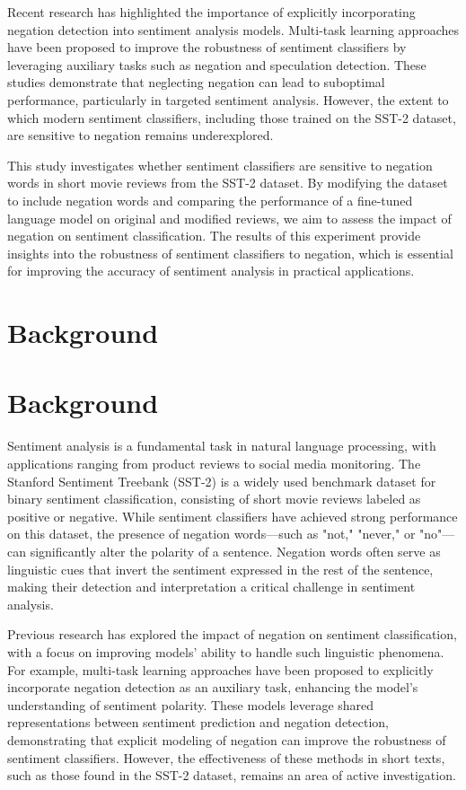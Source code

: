 \documentclass{article}
\begin{document}
Recent research has highlighted the importance of explicitly incorporating negation detection into sentiment analysis models. Multi-task learning approaches have been proposed to improve the robustness of sentiment classifiers by leveraging auxiliary tasks such as negation and speculation detection. These studies demonstrate that neglecting negation can lead to suboptimal performance, particularly in targeted sentiment analysis. However, the extent to which modern sentiment classifiers, including those trained on the SST-2 dataset, are sensitive to negation remains underexplored. 

This study investigates whether sentiment classifiers are sensitive to negation words in short movie reviews from the SST-2 dataset. By modifying the dataset to include negation words and comparing the performance of a fine-tuned language model on original and modified reviews, we aim to assess the impact of negation on sentiment classification. The results of this experiment provide insights into the robustness of sentiment classifiers to negation, which is essential for improving the accuracy of sentiment analysis in practical applications.
\section{Background}
\section{Background}

Sentiment analysis is a fundamental task in natural language processing, with applications ranging from product reviews to social media monitoring. The Stanford Sentiment Treebank (SST-2) is a widely used benchmark dataset for binary sentiment classification, consisting of short movie reviews labeled as positive or negative. While sentiment classifiers have achieved strong performance on this dataset, the presence of negation words—such as "not," "never," or "no"—can significantly alter the polarity of a sentence. Negation words often serve as linguistic cues that invert the sentiment expressed in the rest of the sentence, making their detection and interpretation a critical challenge in sentiment analysis.

Previous research has explored the impact of negation on sentiment classification, with a focus on improving models' ability to handle such linguistic phenomena. For example, multi-task learning approaches have been proposed to explicitly incorporate negation detection as an auxiliary task, enhancing the model's understanding of sentiment polarity. These models leverage shared representations between sentiment prediction and negation detection, demonstrating that explicit modeling of negation can improve the robustness of sentiment classifiers. However, the effectiveness of these methods in short texts, such as those found in the SST-2 dataset, remains an area of active investigation. 
\end{document}
